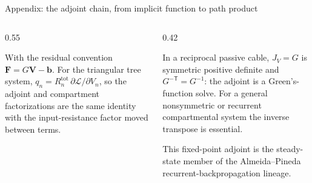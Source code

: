 
\begin{frame}{Appendix: the adjoint chain, from implicit function to path product}
  \begin{columns}[T,onlytextwidth]
    \begin{column}{0.55\textwidth}
      {\footnotesize With the residual convention $\bm F=G\bm V-\bm b$.
       For the triangular tree system,
       $q_n=R_n^{\mathrm{tot}}\,\partial\mathcal L/\partial V_n$, so the
       adjoint and compartment factorizations are the same identity with the
       input-resistance factor moved between terms.\par}
    \end{column}
    \begin{column}{0.42\textwidth}
      {\footnotesize In a reciprocal passive cable, $J_V=G$ is symmetric
       positive definite and $G^{-\mathsf T}=G^{-1}$: the adjoint is a
       Green's-function solve. For a general nonsymmetric or recurrent
       compartmental system the inverse transpose is essential.\par
       \vspace{0.10cm}
       This fixed-point adjoint is the steady-state member of the
       Almeida--Pineda recurrent-backpropagation lineage.\par}
    \end{column}
  \end{columns}
  \vfill
  \vspace{0.04cm}
\end{frame}

